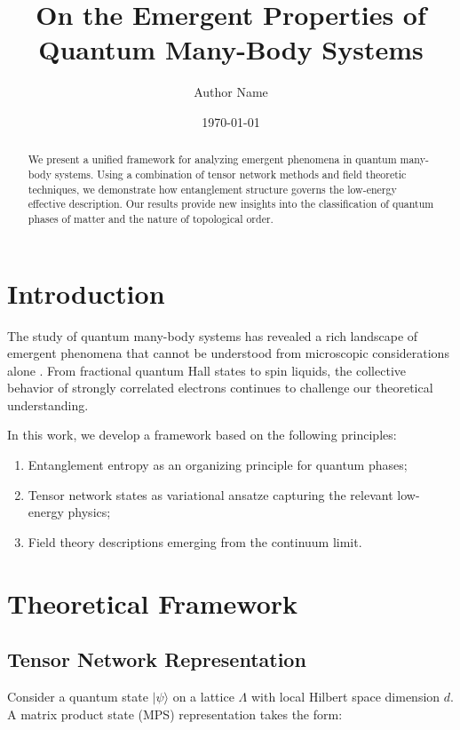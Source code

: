\documentclass[papermode]{academic-report}
\title{On the Emergent Properties of\\Quantum Many-Body Systems}
\author{Author Name}
\date{\today}
\begin{document}
\maketitle

\begin{abstract}
We present a unified framework for analyzing emergent phenomena in quantum
many-body systems. Using a combination of tensor network methods and field
theoretic techniques, we demonstrate how entanglement structure governs the
low-energy effective description. Our results provide new insights into the
classification of quantum phases of matter and the nature of topological order.
\end{abstract}

\section{Introduction}

The study of quantum many-body systems has revealed a rich landscape of emergent
phenomena that cannot be understood from microscopic considerations alone
\cite{witten2018}. From fractional quantum Hall states to spin liquids, the
collective behavior of strongly correlated electrons continues to challenge our
theoretical understanding.

In this work, we develop a framework based on the following principles:
\begin{enumerate}
  \item Entanglement entropy as an organizing principle for quantum phases;
  \item Tensor network states as variational ansatze capturing the relevant
        low-energy physics;
  \item Field theory descriptions emerging from the continuum limit.
\end{enumerate}

\section{Theoretical Framework}

\subsection{Tensor Network Representation}

Consider a quantum state $|\psi\rangle$ on a lattice $\Lambda$ with local
Hilbert space dimension $d$. A matrix product state (MPS) representation takes
the form:
\end{document}
